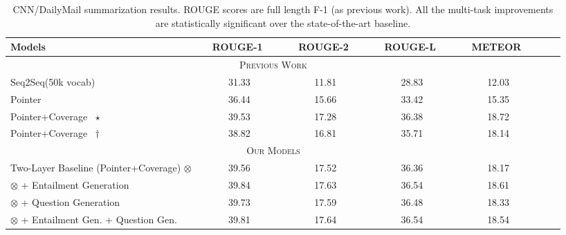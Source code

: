 \documentclass[11pt,a4paper]{article}
\begin{document}
\begin{table*}
\begin{center}
\begin{small}
\begin{tabular}{|l|c|c|c|c|c|c|}
\hline
Models & \ \ ROUGE-1 \ \  & \ \ ROUGE-2 \ \ & \ \ ROUGE-L \ \ & \ \ METEOR \ \ \\
\hline
\multicolumn{5}{|c|}{\textsc{Previous Work}}\\
\hline
Seq2Seq(50k vocab)~\cite{see2017get} & 31.33 & 11.81 & 28.83 & 12.03  \\
Pointer~\cite{see2017get} & 36.44 & 15.66 & 33.42 & 15.35 \\
Pointer+Coverage~\cite{see2017get} $\star$ & 39.53 & 17.28 & 36.38 & 18.72  \\
Pointer+Coverage~\cite{see2017get} $\dagger$ & 38.82 & 16.81 & 35.71 & 18.14 \\
\hline
\multicolumn{5}{|c|}{\textsc{Our Models}}\\
\hline
Two-Layer Baseline (Pointer+Coverage) $\otimes$ & 39.56 & 17.52 & 36.36  & 18.17 \\
$\otimes$ + Entailment Generation & 39.84 & 17.63 & 36.54 & 18.61 \\
$\otimes$ + Question Generation & 39.73 & 17.59 & 36.48 & 18.33  \\
$\otimes$ + Entailment Gen. + Question Gen. & 39.81 & 17.64 & 36.54 & 18.54 \\
\hline
\end{tabular}
\end{small}
\end{center}
\vspace{-10pt}
\caption{CNN/DailyMail summarization results. ROUGE scores are full length F-1 (as previous work). 
All the multi-task improvements are statistically significant over the state-of-the-art baseline.
\vspace{-10pt}
}
\label{table:cnndm_results}
\end{table*}
\end{document}
